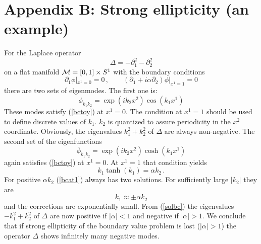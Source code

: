 \documentclass[a4paper,12pt]{article}
\begin{document}
\section*{Appendix B: Strong ellipticity (an example)}
For the Laplace operator
\begin{equation}
\Delta =-\partial_1^2 -\partial_2^2 
\label{Lap}
\end{equation}
on a flat manifold ${\cal M}=[0,1]\times S^1$  
with the boundary conditions
\begin{equation}
\partial_1 \phi |_{x^1=0}=0 \,,\qquad
(\partial_1 +i\alpha \partial_2 )\phi |_{x^1=1}=0 
\label{bctoy}
\end{equation}
there are two sets of eigenmodes. 
The first one is:
\begin{equation}
\phi_{k_1k_2}=\exp (ik_2x^2) \cos (k_1x^1) 
\label{set1}
\end{equation}
These modes satisfy (\ref{bctoy})
at $x^1=0$. The condition at $x^1=1$ should be used
to define discrete values of $k_1$. $k_2$ is quantized
to assure periodicity in the $x^2$ coordinate. 
Obviously, the eigenvalues $k_1^2+k_2^2$
of $\Delta$ are  always non-negative.
The second set of the eigenfunctions 
\begin{equation}
\bar \phi_{k_1k_2}=\exp (ik_2x^2) \cosh (k_1x^1) 
\label{set2}
\end{equation}
again satisfies  (\ref{bctoy})
at $x^1=0$. At $x^1=1$ that condition  yields
\begin{equation}
k_1 \tanh (k_1)=\alpha k_2 \,. 
\label{bcat1}
\end{equation} 
For positive $\alpha k_2$ (\ref{bcat1}) always has two 
solutions. For sufficiently large $|k_2|$ they are
\begin{equation}
k_1 \approx \pm \alpha k_2 
\label{solbc}
\end{equation}
and the corrections are exponentially small. From 
(\ref{solbc}) the eigenvalues $-k_1^2+k_2^2$
of  $\Delta$ are now positive
if $|\alpha|< 1$ and negative if $|\alpha| > 1$. We conclude
that if strong ellipticity of the boundary value problem
is lost ($|\alpha| > 1$) the operator $\Delta$ shows infinitely
many negative modes.


\end{document}
